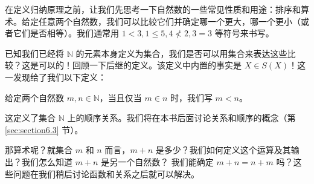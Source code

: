 在定义归纳原理之前，让我们先思考一下自然数的一些常见性质和用途：排序和算术。给定任意两个自然数，我们可以比较它们并确定哪一个更大，哪一个更小（或者它们是否相等）。我们通常用 $1 < 3, 1 \le 5, 4 \nless 2, 3 = 3$ 等符号来书写。

已知我们已经将 $\mathbb{N}$ 的元素本身定义为集合，我们是否可以用集合来表达这些比较？这是可以的！回顾一下后继的定义。该定义中内置的事实是 $X \in S(X)$！这一发现给了我们以下定义：

\begin{definition}
    给定两个自然数 $m, n \in \mathbb{N}$，当且仅当 $m \in n$ 时，我们写 $m < n$。
\end{definition}

这定义了集合 $\mathbb{N}$ 上的顺序关系。我们将在本书后面讨论关系和顺序的概念（第 \ref{sec:section6.3} 节）。

那算术呢？就集合 $m$ 和 $n$ 而言，$m + n$ 是多少？我们如何定义这个运算及其输出？我们怎么知道 $m + n$ 是另一个自然数？ 我们能确定 $m + n = n + m$ 吗？这些问题在我们稍后讨论函数和关系之后就可以解决。
